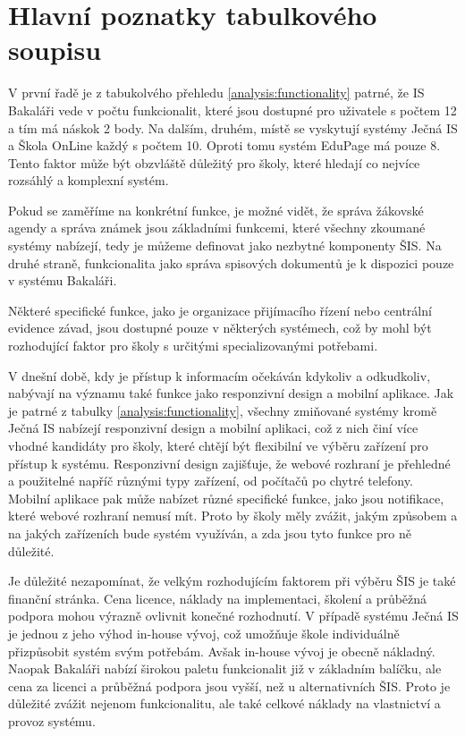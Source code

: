 \documentclass[FM,Proj]{tulthesis}
\begin{document}
\section{Hlavní poznatky tabulkového soupisu}
V první řadě je z tabukolvého přehledu \ref{analysis:functionality} patrné, že IS Bakaláři
vede v počtu funkcionalit, které jsou dostupné pro uživatele s počtem 12 a tím má náskok 2
body. Na dalším, druhém, místě se vyskytují systémy Ječná IS a Škola OnLine každý s počtem 10. 
Oproti tomu systém EduPage má pouze 8. Tento
faktor může být obzvláště důležitý pro školy, které hledají co nejvíce rozsáhlý a komplexní systém.

Pokud se zaměříme na konkrétní funkce, je možné vidět, že správa žákovské agendy a správa známek
jsou základními funkcemi, které všechny zkoumané systémy nabízejí, tedy je můžeme definovat 
jako nezbytné komponenty ŠIS. Na druhé straně, funkcionalita jako správa spisových dokumentů je k dispozici pouze v systému
Bakaláři.

Některé specifické funkce, jako je organizace přijímacího řízení nebo
centrální evidence závad, jsou dostupné pouze v některých systémech, což by mohl
být rozhodující faktor pro školy s určitými specializovanými potřebami.

V dnešní době, kdy je přístup k informacím očekáván kdykoliv
a odkudkoliv, nabývají na významu také funkce jako responzivní 
design a mobilní aplikace. Jak je patrné z tabulky \ref{analysis:functionality},
všechny zmiňované systémy kromě Ječná IS nabízejí responzivní design a mobilní
aplikaci, což z nich činí více vhodné kandidáty pro školy, které chtějí
být flexibilní ve výběru zařízení pro přístup k systému.
Responzivní design zajišťuje, že webové rozhraní je přehledné
a použitelné napříč různými typy zařízení, od počítačů po chytré telefony.
Mobilní aplikace pak může nabízet různé specifické funkce, jako jsou
notifikace, které webové rozhraní nemusí mít. Proto by školy měly zvážit,
jakým způsobem a na jakých zařízeních bude systém využíván, a zda
jsou tyto funkce pro ně důležité. 

Je důležité nezapomínat, že velkým rozhodujícím faktorem při výběru
ŠIS je také finanční stránka. Cena licence, náklady na implementaci, školení a průběžná
podpora mohou výrazně ovlivnit konečné rozhodnutí. V případě systému Ječná IS je jednou
z jeho výhod in-house vývoj, což umožňuje škole individuálně přizpůsobit systém svým
potřebám. Avšak in-house vývoj je obecně nákladný. Naopak Bakaláři nabízí širokou paletu funkcionalit
již v základním balíčku, ale cena za licenci a průběžná podpora jsou vyšší, než u alternativních ŠIS.
Proto je důležité zvážit nejenom funkcionalitu, ale také celkové náklady
na vlastnictví a provoz systému.
\end{document}
